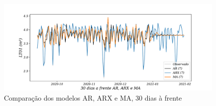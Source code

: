 \begin{figure}[H]
	\centering
	\caption{Comparação dos modelos AR, ARX e MA, 30 dias à frente }
	\label{fig:60-AR-ARX-MA24}
	\includegraphics[width=1\linewidth]{Apendices/Figuras/modelagem-24h/30-AR-ARX-MA}
	
\end{figure}


